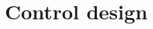 \documentclass[student]{ITRslides}
\begin{document}
%
%		
%
%
%	

\section{Control design}

% 
%
\end{document}
